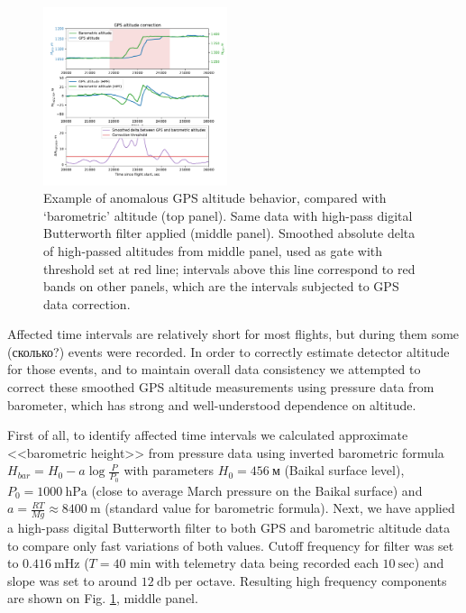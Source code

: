 \documentclass[final,5p,times,twocolumn]{elsarticle}
\begin{document}
\begin{figure}[tb]
    \includegraphics[width=0.48\textwidth]{figs/height_correction.pdf} 
    \caption{Example of anomalous GPS altitude behavior, compared with `barometric' altitude (top panel). Same data with high-pass digital Butterworth filter applied (middle panel). Smoothed absolute delta of high-passed altitudes from middle panel, used as gate with threshold set at red line; intervals above this line correspond to red bands on other panels, which are the intervals subjected to GPS data correction.}
\label{fig:h_corr}
\end{figure}

Affected time intervals are relatively short for most flights, but during them some (сколько?) events were recorded. In order to correctly estimate detector altitude for those events, and to maintain overall data consistency we attempted to correct these smoothed GPS altitude measurements using pressure data from barometer, which has strong and well-understood dependence on altitude.

First of all, to identify affected time intervals we calculated approximate <<barometric height>> from pressure data using inverted barometric formula $H_{bar} = H_0 - a \log \frac{P}{P_0}$ with parameters $H_0 = 456~\textrm{м}$ (Baikal surface level), $P_0 = 1000~\textrm{hPa}$ (close to average March pressure on the Baikal surface) and $a = \frac{RT}{Mg} \approx 8400~\textrm{m}$ (standard value for barometric formula). Next, we have applied a high-pass digital Butterworth filter to both GPS and barometric altitude data to compare only fast variations of both values. Cutoff frequency for filter was set to $0.416~\textrm{mHz}$ ($T=40$ min with telemetry data being recorded each $10~\textrm{sec}$) and slope was set to around $12~\textrm{db per octave}$. Resulting high frequency components are shown on Fig. \ref{fig:h_corr}, middle panel.
\end{document}
